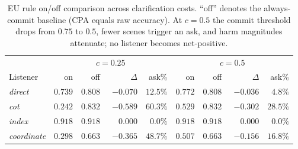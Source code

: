\documentclass[11pt]{article}
\begin{document}
\begin{table}[H]
\centering
\small
\setlength{\tabcolsep}{4pt}
\begin{tabular}{lrrrr|rrrr}
\toprule
& \multicolumn{4}{c|}{$c{=}0.25$} & \multicolumn{4}{c}{$c{=}0.5$} \\
Listener & on & off & $\Delta$ & ask\% & on & off & $\Delta$ & ask\% \\
\midrule
\textit{direct}        & $0.739$ & $0.808$ & $-0.070$ & $12.5\%$ & $0.772$ & $0.808$ & $-0.036$ & $4.8\%$ \\
\textit{cot}           & $0.242$ & $0.832$ & $-0.589$ & $60.3\%$ & $0.529$ & $0.832$ & $-0.302$ & $28.5\%$ \\
\textit{index}         & $0.918$ & $0.918$ & $\phantom{-}0.000$ & $0.0\%$  & $0.918$ & $0.918$ & $\phantom{-}0.000$ & $0.0\%$ \\
\textit{coordinate} & $0.298$ & $0.663$ & $-0.365$ & $48.7\%$ & $0.507$ & $0.663$ & $-0.156$ & $16.8\%$ \\
\bottomrule
\end{tabular}
\caption{EU rule on/off comparison across clarification costs. ``off''
denotes the always-commit baseline (CPA equals raw accuracy). At
$c{=}0.5$ the commit threshold drops from $0.75$ to $0.5$, fewer scenes
trigger an ask, and harm magnitudes attenuate; no listener becomes
net-positive.}
\label{tab:eu-robustness}
\end{table}



\end{document}
